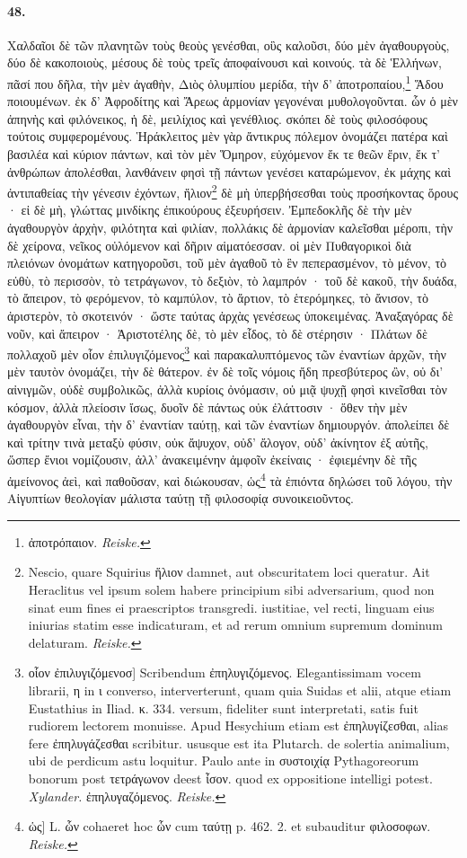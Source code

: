 \documentclass[a4paper, 11pt, oneside, polutonikogreek, german, landscape]{article}
\begin{document}
\paragraph{48.}
Χαλδαῖοι δὲ τῶν πλανητῶν τοὺς θεοὺς γενέσθαι, οὓς καλοῦσι, δύο μὲν ἀγαθουργοὺς, δύο δὲ κακοποιοὺς, μέσους δὲ τοὺς τρεῖς ἀποφαίνουσι καὶ κοινούς. τὰ δὲ Ἑλλήνων, πᾶσί που δῆλα, τὴν μὲν ἀγαθὴν, Διὸς ὀλυμπίου μερίδα, τὴν δ' ἀποτροπαίου,\footnote{ἀποτρόπαιον. \emph{Reiske.}} Ἅδου ποιουμένων. ἐκ δ' Ἀφροδίτης καὶ Ἄρεως ἁρμονίαν γεγονέναι μυθολογοῦνται. ὧν ὁ μὲν ἀπηνὴς καὶ φιλόνεικος, ἡ δὲ, μειλίχιος καὶ γενέθλιος. σκόπει δὲ τοὺς φιλοσόφους τούτοις συμφερομένους. Ἡράκλειτος μὲν γὰρ ἄντικρυς πόλεμον ὀνομάζει πατέρα καὶ βασιλέα καὶ κύριον πάντων, καὶ τὸν μὲν Ὅμηρον, εὐχόμενον ἔκ τε θεῶν ἔριν, ἔκ τ' ἀνθρώπων ἀπολέσθαι, λανθάνειν φησὶ τῇ πάντων γενέσει καταρώμενον, ἐκ μάχης καὶ ἀντιπαθείας τὴν γένεσιν ἐχόντων, ἥλιον\footnote{Nescio, quare Squirius ἥλιον damnet, aut obscuritatem loci queratur. Ait Heraclitus vel ipsum solem habere principium sibi adversarium, quod non sinat eum fines ei praescriptos transgredi. iustitiae, vel recti, linguam eius iniurias statim esse indicaturam, et ad rerum omnium supremum dominum delaturam. \emph{Reiske.}} δὲ μὴ ὑπερβήσεσθαι τοὺς προσήκοντας ὅρους · εἰ δὲ μὴ, γλώττας μινδίκης ἐπικούρους ἐξευρήσειν. Ἐμπεδοκλῆς δὲ τὴν μὲν ἀγαθουργὸν ἀρχὴν, φιλότητα καὶ φιλίαν, πολλάκις δὲ ἁρμονίαν καλεῖσθαι μέροπι, τὴν δὲ χείρονα, νεῖκος οὐλόμενον καὶ δῆριν αἱματόεσσαν. οἱ μὲν Πυθαγορικοὶ διὰ πλειόνων ὀνομάτων κατηγοροῦσι, τοῦ μὲν ἀγαθοῦ τὸ ἓν πεπερασμένον, τὸ μένον, τὸ εὐθὺ, τὸ περισσὸν, τὸ τετράγωνον, τὸ δεξιὸν, τὸ λαμπρόν · τοῦ δὲ κακοῦ, τὴν δυάδα, τὸ ἄπειρον, τὸ φερόμενον, τὸ καμπύλον, τὸ ἄρτιον, τὸ ἑτερόμηκες, τὸ ἄνισον, τὸ ἀριστερὸν, τὸ σκοτεινόν · ὥστε ταύτας ἀρχὰς γενέσεως ὑποκειμένας. Ἀναξαγόρας δὲ νοῦν, καὶ ἄπειρον · Ἀριστοτέλης δὲ, τὸ μὲν εἶδος, τὸ δὲ στέρησιν · Πλάτων δὲ πολλαχοῦ μὲν οἷον ἐπιλυγιζόμενος\footnote{οἷον ἐπιλυγιζόμενοσ] Scribendum ἐπηλυγιζόμενος. Elegantissimam vocem librarii, η in ι converso, interverterunt, quam quia Suidas et alii, atque etiam Eustathius in Iliad. κ. 334. versum, fideliter sunt interpretati, satis fuit rudiorem lectorem monuisse. Apud Hesychium etiam est ἐπηλυγίζεσθαι, alias fere ἐπηλυγάζεσθαι scribitur. ususque est ita Plutarch. de solertia animalium, ubi de perdicum astu loquitur. Paulo ante in συστοιχίᾳ Pythagoreorum bonorum post τετράγωνον deest ἶσον. quod ex oppositione intelligi potest. \emph{Xylander.} ἐπηλυγαζόμενος. \emph{Reiske.}} καὶ παρακαλυπτόμενος τῶν ἐναντίων ἀρχῶν, τὴν μὲν ταυτὸν ὀνομάζει, τὴν δὲ θάτερον. ἐν δὲ τοῖς νόμοις ἤδη πρεσβύτερος ὢν, οὐ δι' αἰνιγμῶν, οὐδὲ συμβολικῶς, ἀλλὰ κυρίοις ὀνόμασιν, οὐ μιᾷ ψυχῇ φησὶ κινεῖσθαι τὸν κόσμον, ἀλλὰ πλείοσιν ἴσως, δυοῖν δὲ πάντως οὐκ ἐλάττοσιν · ὅθεν τὴν μὲν ἀγαθουργὸν εἶναι, τὴν δ' ἐναντίαν ταύτῃ, καὶ τῶν ἐναντίων δημιουργόν. ἀπολείπει δὲ καὶ τρίτην τινὰ μεταξὺ φύσιν, οὐκ ἄψυχον, οὐδ' ἄλογον, οὐδ' ἀκίνητον ἐξ αὑτῆς, ὥσπερ ἔνιοι νομίζουσιν, ἀλλ' ἀνακειμένην ἀμφοῖν ἐκείναις · ἐφιεμένην δὲ τῆς ἀμείνονος ἀεὶ, καὶ παθοῦσαν, καὶ διώκουσαν, ὡς\footnote{ὡς] L. ὧν cohaeret hoc ὧν cum ταύτῃ p. 462. 2. et subauditur φιλοσοφων. \emph{Reiske.}} τὰ ἐπιόντα δηλώσει τοῦ λόγου, τὴν Αἰγυπτίων θεολογίαν μάλιστα ταύτῃ τῇ φιλοσοφίᾳ συνοικειοῦντος.
\end{document}
